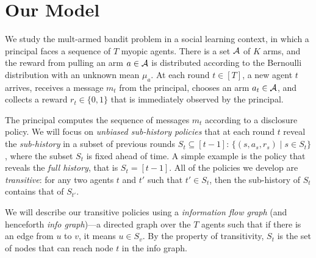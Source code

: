 \section{Our Model}
\label{sec:model}

We study the mult-armed bandit problem in a social learning context,
in which a principal faces a sequence of $T$ myopic agents. There is a
set $\mathcal{A}$ of $K$ arms, and the reward from pulling an arm $a\in \mathcal{A}$ is
distributed according to the Bernoulli distribution with an unknown
mean $\mu_a$.  At
each round $t\in [T]$, a new agent $t$ arrives, receives a message
$m_t$ from the principal, chooses an arm $a_t\in \mathcal{A}$, and collects a
reward $r_t\in \{0,1\}$ that is immediately observed by the
principal. 



 The principal computes the
sequence of messages $m_t$ according to a disclosure policy. We will
focus on \emph{unbiased sub-history policies} that at each round $t$
reveal the \emph{sub-history} in a subset of previous rounds
$S_t\subseteq [t-1]$: $\{(s, a_s, r_s)\mid s \in S_t\}$, where the
subset $S_t$ is fixed ahead of time. A simple example is the policy
that reveals the \emph{full history}, that is $S_t = [t-1]$.  All of
the policies we develop are \emph{transitive}: for any two agents $t$
and $t'$ such that $t'\in S_t$, then the sub-history of $S_t$ contains
that of $S_{t'}$.


 We will describe our transitive
policies using a \emph{information flow graph} (and henceforth
\emph{info graph})---a directed graph over the $T$ agents such that if
there is an edge from $u$ to $v$, it means $u\in S_v$. By the property
of transitivity, $S_t$ is the set of nodes that can reach node $t$ in
the info graph.

\iffalse
\begin{itemize}
\item \textbf{Full history:} We show each agent the history of all previous agents' pulls. We call this policy \ALGG. 
\item \textbf{Unbiased sub-history:} We show each agent only a subset of history. The subsets are pre-determined before any arms are pulled.  
\item \textbf{Info graph:} All the recommendation policies in this paper can be described by an undirected transitive graph with $T$ nodes. We call it the info graph. The $T$ nodes in the graph represent the $T$ agents. If there is an edge between node $u$ and $v$ for $u < v$, it means the history of agent $u$ is shown to agent $v$.
\end{itemize}
\fi

